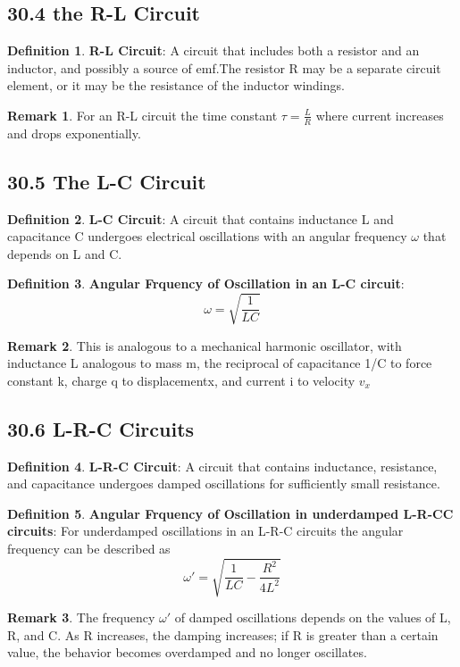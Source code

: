 \documentclass[12pt]{amsart}
\theoremstyle{definition}
\newtheorem{definition}{Definition} %
\newtheorem*{remark}{Remark}        %
\numberwithin{equation}{theorem}    %
\begin{document}
\subsection*{30.4 the R-L Circuit}

\begin{definition}
    \textbf{R-L Circuit}:
    A circuit that includes both a resistor and an inductor, and possibly a source of emf.The resistor R may be a separate circuit element, or it may be the resistance of the inductor windings.
    \begin{remark}
        For an R-L circuit the time constant $\tau = \frac{L}{R}$ where current increases and drops exponentially. 
    \end{remark}
\end{definition}

\subsection*{30.5 The L-C Circuit}

\begin{definition}
    \textbf{L-C Circuit}:
    A circuit that contains inductance L and capacitance C undergoes electrical oscillations with an angular frequency $\omega$ that depends on L and C.
\end{definition}

\begin{definition}
    \textbf{Angular Frquency of Oscillation in an L-C circuit}:
    $$\omega = \sqrt{\frac{1}{LC}}$$ 
    \begin{remark}
        This is analogous to a mechanical harmonic oscillator, with inductance L analogous to mass m, the reciprocal of capacitance 1/C to force constant k, charge q to displacementx, and current i to velocity $v_x$
    \end{remark}
\end{definition}


\subsection*{30.6 L-R-C Circuits}

\begin{definition}
    \textbf{L-R-C Circuit}:
    A circuit that contains inductance, resistance, and capacitance undergoes damped oscillations for sufficiently small resistance.
\end{definition}


\begin{definition}
    \textbf{Angular Frquency of Oscillation in underdamped L-R-CC circuits}:
    For underdamped oscillations in an L-R-C circuits the angular frequency can be described as $$\omega' = \sqrt{\frac{1}{LC} - \frac{R^2}{4L^2}}$$

    \begin{remark}
        The frequency $\omega'$ of damped oscillations depends on the values of L, R, and C. As R increases, the damping increases; if R is greater than a certain value, the behavior becomes overdamped and no longer oscillates. 
    \end{remark}
\end{definition}
\end{document}
